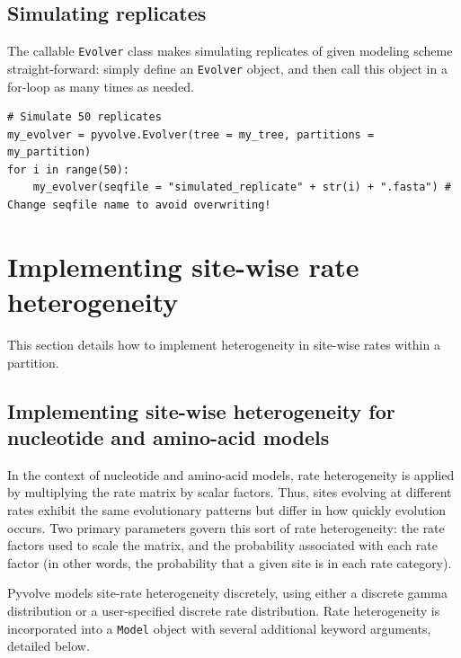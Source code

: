 \documentclass{article}
\newcommand{\code}[1]{\texttt{\small{#1}}}
\begin{document}
\subsection{Simulating replicates}

The callable \code{Evolver} class makes simulating replicates of given modeling scheme straight-forward: simply define an \code{Evolver} object, and then call this object in a for-loop as many times as needed.

\begin{lstlisting}
# Simulate 50 replicates
my_evolver = pyvolve.Evolver(tree = my_tree, partitions = my_partition)
for i in range(50):
	my_evolver(seqfile = "simulated_replicate" + str(i) + ".fasta") # Change seqfile name to avoid overwriting!
\end{lstlisting}


















\section{Implementing site-wise rate heterogeneity}\label{sec:sitehet}

This section details how to implement heterogeneity in site-wise rates within a partition.


\subsection{Implementing site-wise heterogeneity for nucleotide and amino-acid models}

In the context of nucleotide and amino-acid models, rate heterogeneity is applied by multiplying the rate matrix by scalar factors. Thus, sites evolving at different rates exhibit the same evolutionary patterns but differ in how quickly evolution occurs. Two primary parameters govern this sort of rate heterogeneity: the rate factors used to scale the matrix, and the probability associated with each rate factor (in other words, the probability that a given site is in each rate category).

Pyvolve models site-rate heterogeneity discretely, using either a discrete gamma distribution or a user-specified discrete rate distribution. Rate heterogeneity is incorporated into a \code{Model} object with several additional keyword arguments, detailed below.
\end{document}
